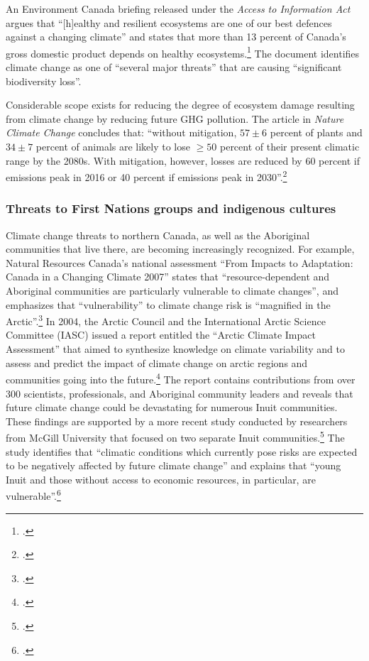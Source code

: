 \documentclass[10pt]{article}
\begin{document}
An Environment Canada briefing released under the \emph{Access to Information Act} argues that ``[h]ealthy and resilient ecosystems are one of our best defences against a changing climate'' and states that more than 13 percent of Canada's gross domestic product depends on healthy ecosystems.\footcite[][]{CanadaEcosystemBriefing}
The document identifies climate change as one of ``several major threats'' that are causing ``significant biodiversity loss''.




Considerable scope exists for reducing the degree of ecosystem damage resulting from climate change by reducing future GHG pollution.
The article in \emph{Nature Climate Change} concludes that: ``without mitigation, $57 \pm 6$ percent of plants and $34 \pm 7$ percent of animals are likely to lose $\ge 50$ percent of their present climatic range by the 2080s. With mitigation, however, losses are reduced by 60 percent if emissions peak in 2016 or 40 percent if emissions peak in 2030''.\footcite[][]{WarrenBiodiversity}



	\subsubsection{Threats to First Nations groups and indigenous cultures}



Climate change threats to northern Canada, as well as the Aboriginal communities that live there, are becoming increasingly recognized. 
For example, Natural Resources Canada's national assessment ``From Impacts to Adaptation: Canada in a Changing Climate 2007'' states that ``resource-dependent and Aboriginal communities are particularly vulnerable to climate changes'', and emphasizes that ``vulnerability'' to climate change risk is ``magnified in the Arctic''.\footcite[][p.3, p. 14]{ImpToAda} 
In 2004, the Arctic Council and the International Arctic Science Committee (IASC) issued a report entitled the ``Arctic Climate Impact Assessment'' that aimed  to synthesize knowledge on climate variability and to assess and predict the impact of climate change on arctic regions and communities going into the future.\footcite[][]{ACIA2004}
The report contains contributions from over 300 scientists, professionals, and Aboriginal community leaders and reveals that future climate change could be devastating for numerous Inuit communities.
These findings are supported by a more recent study conducted by researchers from McGill University that focused on two separate Inuit communities.\footcite[][]{CCInuitCommunities}
The study identifies that ``climatic conditions which currently pose risks are expected to be negatively affected by future climate change'' and explains that ``young Inuit and those without access to economic resources, in particular, are vulnerable''.\footcite[][p. 45, p. 54]{CCInuitCommunities}
\end{document}
